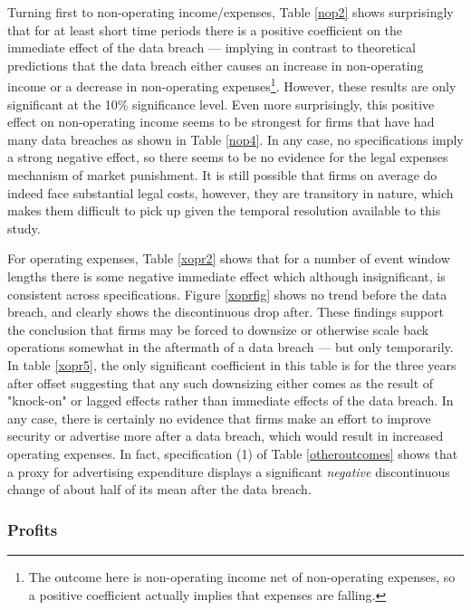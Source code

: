 \documentclass[../Main.tex]{subfiles}
\begin{document}
Turning first to non-operating income/expenses, Table \ref{nop2} shows surprisingly that for at least short time periods there is a positive coefficient on the immediate effect of the data breach --- implying in contrast to theoretical predictions that the data breach either causes an increase in non-operating income or a decrease in non-operating expenses\footnote{The outcome here is non-operating income net of non-operating expenses, so a positive coefficient actually implies that expenses are falling.}. However, these results are only significant at the 10\% significance level. Even more surprisingly, this positive effect on non-operating income seems to be strongest for firms that have had many data breaches as shown in Table \ref{nop4}. In any case, no specifications imply a strong negative effect, so there seems to be no evidence for the legal expenses mechanism of market punishment. It is still possible that firms on average do indeed face substantial legal costs, however, they are transitory in nature, which makes them difficult to pick up given the temporal resolution available to this study.

For operating expenses, Table \ref{xopr2} shows that for a number of event window lengths there is some negative immediate effect which although insignificant, is consistent across specifications. Figure \ref{xoprfig} shows no trend before the data breach, and clearly shows the discontinuous drop after. These findings support the conclusion that firms may be forced to downsize or otherwise scale back operations somewhat in the aftermath of a data breach --- but only temporarily. In table \ref{xopr5}, the only significant coefficient in this table is for the three years after offset suggesting that any such downsizing either comes as the result of "knock-on" or lagged effects rather than immediate effects of the data breach. In any case, there is certainly no evidence that firms make an effort to improve security or advertise more after a data breach, which would result in increased operating expenses. In fact, specification (1) of Table \ref{otheroutcomes} shows that a proxy for advertising expenditure displays a significant \textit{negative} discontinuous change of about half of its mean after the data breach.

\subsubsection{Profits}
\end{document}
